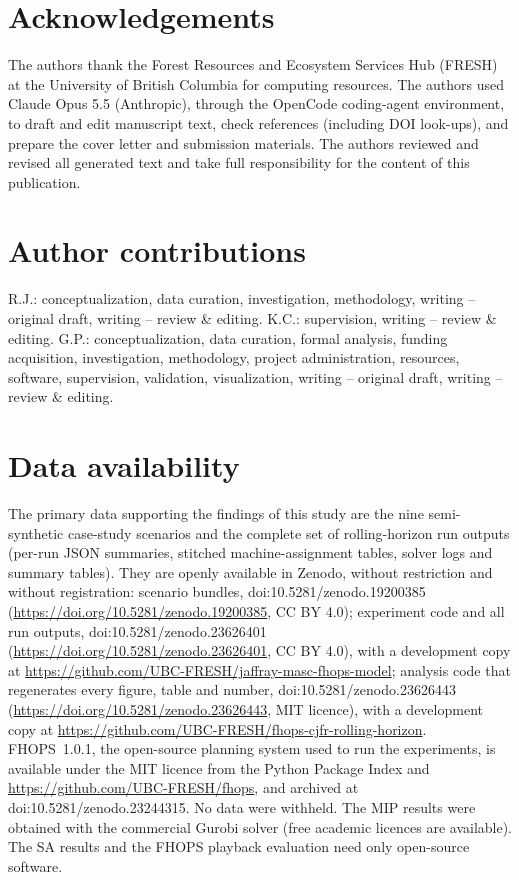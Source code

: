 \section*{Acknowledgements}
The authors thank the Forest Resources and Ecosystem Services Hub (FRESH) at the University of
British Columbia for computing resources. The authors used Claude Opus 5.5 (Anthropic), through the
OpenCode coding-agent environment, to draft and edit manuscript text, check references (including
DOI look-ups), and prepare the cover letter and submission materials. The authors reviewed and
revised all generated text and take full responsibility for the content of this publication.

\section*{Author contributions}
R.J.: conceptualization, data curation, investigation, methodology, writing -- original draft,
writing -- review \& editing. K.C.: supervision, writing -- review \& editing. G.P.:
conceptualization, data curation, formal analysis, funding acquisition, investigation,
methodology, project administration, resources, software, supervision, validation, visualization,
writing -- original draft, writing -- review \& editing.

\section*{Data availability}
The primary data supporting the findings of this study are the nine semi-synthetic case-study
scenarios and the complete set of rolling-horizon run outputs (per-run JSON summaries, stitched
machine-assignment tables, solver logs and summary tables). They are openly available in Zenodo,
without restriction and without registration: scenario bundles, doi:10.5281/zenodo.19200385
(\url{https://doi.org/10.5281/zenodo.19200385}, CC BY 4.0); experiment code and all run outputs,
doi:10.5281/zenodo.23626401 (\url{https://doi.org/10.5281/zenodo.23626401}, CC BY 4.0), with a
development copy at \url{https://github.com/UBC-FRESH/jaffray-masc-fhops-model}; analysis code that
regenerates every figure, table and number, doi:10.5281/zenodo.23626443
(\url{https://doi.org/10.5281/zenodo.23626443}, MIT licence), with a development copy at
\url{https://github.com/UBC-FRESH/fhops-cjfr-rolling-horizon}. FHOPS~1.0.1, the open-source planning
system used to run the experiments, is available under the MIT licence from the Python Package Index
and \url{https://github.com/UBC-FRESH/fhops}, and archived at doi:10.5281/zenodo.23244315. No data
were withheld.
The MIP results were obtained with the commercial Gurobi solver (free academic licences are
available). The SA results and the FHOPS playback evaluation need only open-source software.
